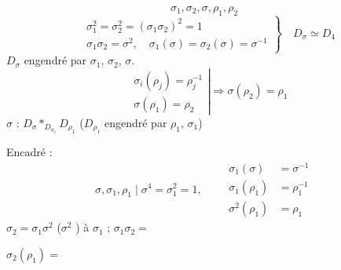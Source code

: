 \documentclass[11pt,a4paper]{article}
\begin{document}
\[
\sigma_1, \sigma_2, \sigma, \rho_1, \rho_2
\]
\[
\left.
\begin{aligned}
&\sigma_1^2 = \sigma_2^2 = (\sigma_1\sigma_2)^2 = 1 \\
&\sigma_1\sigma_2 = \sigma^2, \quad \sigma_1(\sigma) = \sigma_2(\sigma) = \sigma^{-1}
\end{aligned}
\right\}
\quad D_\sigma \simeq D_4
\]
$D_\sigma$ engendré par $\sigma_1$, $\sigma_2$, $\sigma$.
\[
\left.
\begin{aligned}
&\sigma_i(\rho_j) = \rho_j^{-1} \\
&\sigma(\rho_1) = \rho_2
\end{aligned}
\right|
\Longrightarrow \sigma(\rho_2) = \rho_1
\]
$\sigma$ : $D_\sigma \ast_{D_{\sigma_1}} D_{\rho_1}$ ($D_{\rho_1}$ engendré par $\rho_1$, $\sigma_1$)

Encadré :
\[
\sigma, \sigma_1, \rho_1 \;\Big|\; \sigma^4 = \sigma_1^2 = 1, \qquad
\begin{aligned}
\sigma_1(\sigma) &= \sigma^{-1} \\
\sigma_1(\rho_1) &= \rho_1^{-1} \\
\sigma^2(\rho_1) &= \rho_1
\end{aligned}
\]
$\sigma_2 = \sigma_1\sigma^2$ ($\sigma^2$ )  à $\sigma_1$ ; $\sigma_1\sigma_2 =$

$\sigma_2(\rho_1) =$
\end{document}

